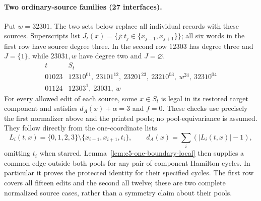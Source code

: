 \paragraph{Two ordinary-source families (27 interfaces).}
Put $w=32301$. The two sets below replace all individual records
with these sources. Superscripts list
$J_t(x)=\{j:t_j\in\{x_{j-1},x_{j+1}\}\}$; all six words in the
first row have source degree three. In the second row $12303$ has
degree three and $J=\{1\}$, while $23031,w$ have degree two and
$J=\varnothing$.
\[
\begin{array}{c|l}
t&S_t\\ \hline
01023&12310^{01},\ 23101^{12},\ 23201^{23},\ 23210^{03},\ w^{24},\ 32310^{04}\\
01124&12303^{1},\ 23031,\ w
\end{array}
\]
For every allowed edit of each source, some $x\in S_t$ is legal
in its restored target component and satisfies $d_A(x)+\alpha=3$
and $f=0$. These checks use precisely the first normalizer above
and the printed pools; no pool-equivariance is assumed.
They follow directly from the one-coordinate lists
\[
L_i(t,x)=\{0,1,2,3\}\setminus\{x_{i-1},x_{i+1},t_i\},\qquad
d_A(x)=\sum_i(|L_i(t,x)|-1),
\]
omitting $t_i$ when starred. Lemma~\ref{lem:c5-one-boundary-local}
then supplies a common edge outside both pools for any pair of
component Hamilton cycles. In particular it proves the protected
identity for their specified cycles. The first row covers all fifteen
edits and the second all twelve; these are two complete normalized
source cases, rather than a symmetry claim about their pools.

